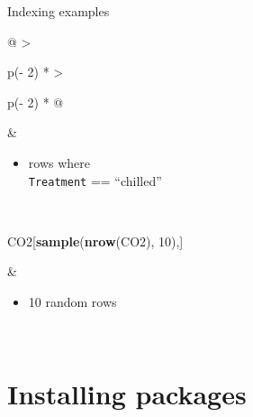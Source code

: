 \documentclass[
  11pt,
  ignorenonframetext,
]{beamer}
\newenvironment{Shaded}{\begin{snugshade}}{\end{snugshade}}
\newcommand{\DecValTok}[1]{\textcolor[rgb]{0.00,0.00,0.81}{#1}}
\newcommand{\FunctionTok}[1]{\textcolor[rgb]{0.13,0.29,0.53}{\textbf{#1}}}
\newcommand{\NormalTok}[1]{#1}
\newcommand{\SpecialCharTok}[1]{\textcolor[rgb]{0.81,0.36,0.00}{\textbf{#1}}}
\newcommand{\StringTok}[1]{\textcolor[rgb]{0.31,0.60,0.02}{#1}}
\newcommand{\VariableTok}[1]{\textcolor[rgb]{0.00,0.00,0.00}{#1}}
\providecommand{\tightlist}{%
  \setlength{\itemsep}{0pt}\setlength{\parskip}{0pt}}
\newcommand{\name}[1]{\VariableTok{\texttt{#1}}}
\begin{document}
\begin{frame}{Indexing examples}
\begin{longtable}[]{@{}
  >{\raggedright\arraybackslash}p{(\columnwidth - 2\tabcolsep) * }
  >{\raggedright\arraybackslash}p{(\columnwidth - 2\tabcolsep) * }@{}}
\begin{minipage}[t]{\linewidth}\raggedright
\begin{Shaded}
\end{Shaded}
\end{minipage} & \begin{minipage}[t]{\linewidth}\raggedright
\begin{itemize}
\tightlist
\item
  rows where\\
  \name{Treatment} == ``chilled''
\end{itemize}\strut
\end{minipage} \\
\begin{minipage}[t]{\linewidth}\raggedright
\begin{Shaded}
\begin{Highlighting}[]
\NormalTok{CO2[}\FunctionTok{sample}\NormalTok{(}\FunctionTok{nrow}\NormalTok{(CO2), }\DecValTok{10}\NormalTok{),]}
\end{Highlighting}
\end{Shaded}
\end{minipage} & \begin{minipage}[t]{\linewidth}\raggedright
\begin{itemize}
\tightlist
\item
  10 random rows
\end{itemize}
\end{minipage} \\
\bottomrule\noalign{}
\end{longtable}
\end{frame}

\hypertarget{installing-packages}{%
\section{Installing packages}\label{installing-packages}}
\end{document}
